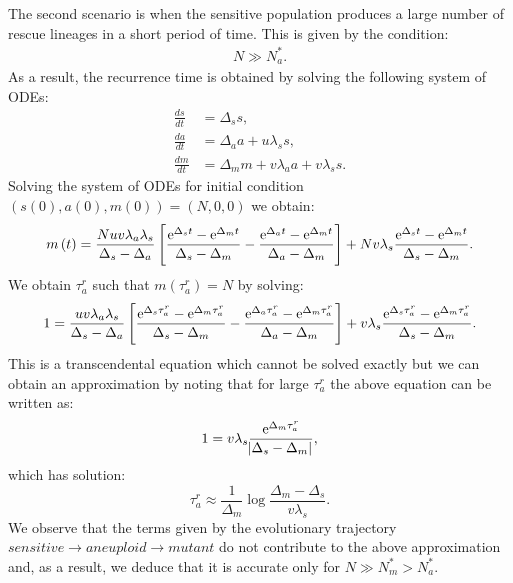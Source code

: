 \documentclass[12pt]{extarticle}
\newcommand{\e}{{\rm e}}
\begin{document}
\begin{appendices}
The second scenario is when the sensitive population produces a large number of rescue lineages in a short period of time. This is given by the condition:
\begin{align*}
N\gg N_a^*.
\end{align*}
As a result, the recurrence time is obtained by solving the following system of ODEs:
\begin{equation}\label{detODE}
\begin{aligned}
\frac{ds}{dt}&=\Delta_ss,\\
\frac{da}{dt}&=\Delta_aa+u\lambda_ss,\\
\frac{dm}{dt}&=\Delta_mm+v\lambda_aa+v\lambda_ss.
\end{aligned}
\end{equation}
Solving the system of ODEs for initial condition $\left(s(0), a(0), m(0)\right)=\left(N,0,0\right)$ we obtain:
\begin{align*}
m\left(t\right)=\frac{Nuv\lambda_a\lambda_s}{\Delta_s-\Delta_a}\left[\frac{\e^{\Delta_st}-\e^{\Delta_mt}}{\Delta_s-\Delta_m}-\frac{\e^{\Delta_at}-\e^{\Delta_mt}}{\Delta_a-\Delta_m}\right]+Nv\lambda_s\frac{\e^{\Delta_st}-\e^{\Delta_mt}}{\Delta_s-\Delta_m}.
\end{align*}
We obtain $\tau_a^r$ such that $m\left(\tau_a^r\right)=N$ by solving:
\begin{equation}\label{eq:t2det2024}
1=\frac{uv\lambda_a\lambda_s}{\Delta_s-\Delta_a}\left[\frac{\e^{\Delta_s\tau_a^r}-\e^{\Delta_m\tau_a^r}}{\Delta_s-\Delta_m}-\frac{\e^{\Delta_a\tau_a^r}-\e^{\Delta_m\tau_a^r}}{\Delta_a-\Delta_m}\right]+v\lambda_s\frac{\e^{\Delta_s\tau_a^r}-\e^{\Delta_m\tau_a^r}}{\Delta_s-\Delta_m}.
\end{equation}
This is a transcendental equation which cannot be solved exactly but we can obtain an approximation by noting that for large $\tau_a^r$ the above equation can be written as: 
\begin{equation*}
1=v\lambda_s\frac{\e^{\Delta_m\tau_a^r}}{\abs{\Delta_s-\Delta_m}},
\end{equation*}
which has solution:
\begin{equation}\label{eq:t2det}
\tau_a^r\approx\frac{1}{\Delta_m}\log\frac{\Delta_m-\Delta_s}{v\lambda_s}.
\end{equation}
We observe that the terms given by the evolutionary trajectory $sensitive \rightarrow aneuploid \rightarrow mutant$ do not contribute to the above approximation and, as a result, we deduce that it is accurate only for $N\gg N_m^*>N_a^*$. %


\end{appendices}
\end{document}
